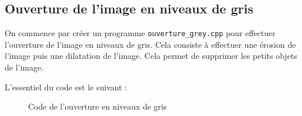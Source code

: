 \documentclass[french,a4paper,10pt]{article}
\begin{document}
	\newpage
	\subsection{Ouverture de l'image en niveaux de gris}\label{subsec:5.4}

	On commence par créer un programme \texttt{ouverture\_grey.cpp} pour effectuer l'ouverture de l'image en niveaux
	de gris.
	Cela consiste à effectuer une érosion de l'image puis une dilatation de l'image.
	Cela permet de supprimer les petits objets de l'image.

	L'essentiel du code est le suivant : %
	\begin{figure}[!htb]
		\centering
		\caption{Code de l'ouverture en niveaux de gris}\label{Fig:ouverture-grey-code}
	\end{figure}
\end{document}
